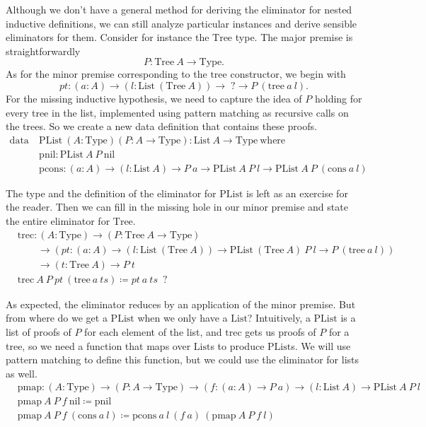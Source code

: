 \documentclass{report}
\newcommand{\List}{\const{List}}
\newcommand{\nil}{\const{nil}}
\newcommand{\cons}{\const{cons}}
\newcommand{\PList}{\const{PList}}
\newcommand{\pnil}{\const{pnil}}
\newcommand{\pcons}{\const{pcons}}
\newcommand{\Tree}{\const{Tree}}
\newcommand{\tree}{\const{tree}}
\newcommand{\const}[1]{\text{#1}}
\newcommand{\data}{\const{data}}
\newcommand{\Type}{\const{Type}}
\newcommand{\where}{\const{where}}
\begin{document}
Although we don't have a general method for deriving the eliminator for nested inductive definitions, we can still analyze particular instances and derive sensible eliminators for them. Consider for instance the $\Tree$ type. The major premise is straightforwardly $$P: \Tree ~ A \to \Type.$$ As for the minor premise corresponding to the $\tree$ constructor, we begin with $$pt: (a: A) \to (l: \List ~ (\Tree ~ A)) \to \; ? \to P ~ (\tree ~ a ~ l).$$ For the missing inductive hypothesis, we need to capture the idea of $P$ holding for every tree in the list, implemented using pattern matching as recursive calls on the trees. So we create a new data definition that contains these proofs.
%
\begin{align*}
    \data ~ &\PList ~ (A: \Type) (P: A \to \Type): \List ~ A \to \Type ~ \where \\
    &\pnil: \PList ~ A ~ P ~ \nil \\
    &\pcons: (a: A) \to (l: \List ~ A) \to P ~ a \to \PList ~ A ~ P ~ l \to \PList ~ A ~ P ~ (\cons ~ a ~ l)
\end{align*}

The type and the definition of the eliminator for $\PList$ is left as an exercise for the reader. Then we can fill in the missing hole in our minor premise and state the entire eliminator for $\Tree$.
%
\begin{align*}
    &\const{trec}: (A: \Type) \to (P: \Tree ~ A \to \Type) \\
    &\qquad\to (pt: (a: A) \to (l: \List ~ (\Tree ~ A)) \to \PList ~ (\Tree ~ A) ~ P ~ l \to P ~ (\tree ~ a ~ l)) \\
    &\qquad\to (t: \Tree ~ A) \to P ~ t \\
    &\const{trec} ~ A ~ P ~ pt ~ (\tree ~ a ~ ts) \coloneqq pt ~ a ~ ts ~ \; ?
\end{align*}

As expected, the eliminator reduces by an application of the minor premise. But from where do we get a $\PList$ when we only have a $\List$? Intuitively, a $\PList$ is a list of proofs of $P$ for each element of the list, and $\const{trec}$ gets us proofs of $P$ for a tree, so we need a function that maps over $\List$s to produce $\PList$s. We will use pattern matching to define this function, but we could use the eliminator for lists as well.
%
\begin{align*}
    &\const{pmap}: (A: \Type) \to (P: A \to \Type) \to (f: (a: A) \to P ~ a) \to (l: \List ~ A) \to \PList ~ A ~ P ~ l \\
    &\const{pmap} ~ A ~ P ~ f ~ \nil \coloneqq \pnil \\
    &\const{pmap} ~ A ~ P ~ f ~ (\cons ~ a ~ l) \coloneqq \pcons ~ a ~ l ~ (f ~ a) ~ (\const{pmap} ~ A ~ P ~ f ~ l)
\end{align*}
\end{document}
